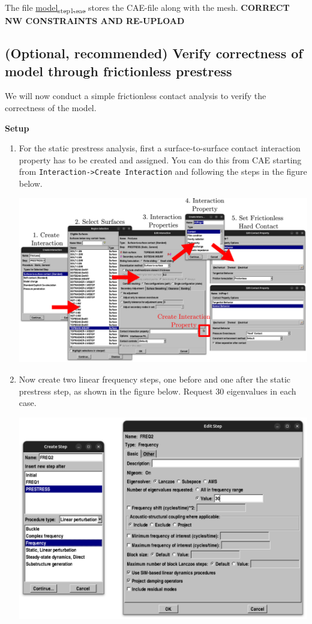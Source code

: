 \documentclass[11pt]{article}
\begin{document}
The file \href{https://github.com/Nidish96/Abaqus4Joints/blob/main/assets/assembly/model\_step1.cae}{model\textsubscript{step1.cae}} stores the CAE-file along with the mesh.
\textbf{CORRECT NW CONSTRAINTS AND RE-UPLOAD}
\subsection{(Optional, recommended) Verify correctness of model through frictionless prestress}
\label{sec:org67d5a98}
We will now conduct a simple frictionless contact analysis to verify the correctness of the model.

\textbf{Setup}
\begin{enumerate}
\item For the static prestress analysis, first a surface-to-surface contact interaction property has to be created and assigned.
You can do this from CAE starting from \texttt{Interaction->Create Interaction} and following the steps in the figure below.
\begin{center}
\includegraphics[width=.9\linewidth]{./figs/setcontact.png}
\end{center}
\item Now create two linear frequency steps, one before and one after the static prestress step, as shown in the figure below.
Request 30 eigenvalues in each case.
\begin{center}
\includegraphics[width=.9\linewidth]{./figs/lfreq.png}

\end{center}
\end{enumerate}
\end{document}
